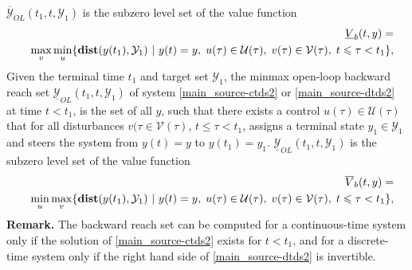 \documentclass[letterpaper,10pt,english]{sphinxmanual}
\begin{document}
$\overline{{\mathcal Y}}_{OL}(t_1, t, {\mathcal Y}_1)$ is the
subzero level set of the value function
\label{main_source:equation-maxminvfb}\begin{gather}
\begin{split}\begin{aligned}
&&\underline{V}_b(t, y) = \nonumber \\
&&\max_v\min_u\{{\bf dist}(y(t_1), {\mathcal Y}_1) ~|~ y(t)=y, \; u(\tau)\in{\mathcal U}(\tau), \;
v(\tau)\in{\mathcal V}(\tau), \; t\leqslant\tau<t_1\},
\end{aligned}\end{split}\label{main_source-maxminvfb}
\end{gather}
Given the terminal time $t_1$ and target set
${\mathcal Y}_1$, the minmax open-loop backward reach set
$\underline{{\mathcal Y}}_{OL}(t_1, t, {\mathcal Y}_1)$ of system
\eqref{main_source-ctds2} or \eqref{main_source-dtds2} at time $t<t_1$, is the set of all $y$,
such that there exists a control $u(\tau)\in{\mathcal U}(\tau)$
that for all disturbances $v(\tau\in{\mathcal V}(\tau)$,
$t\leqslant\tau<t_1$, assigns a terminal state
$y_1\in{\mathcal Y}_1$ and steers the system from $y(t)=y$
to $y(t_1)=y_1$.
$\underline{{\mathcal Y}}_{OL}(t_1, t, {\mathcal Y}_1)$ is the
subzero level set of the value function
\label{main_source:equation-minmaxvfb}\begin{gather}
\begin{split}\begin{aligned}
&&\overline{V}_b(t, y) = \nonumber \\
&&\min_u\max_v\{{\bf dist}(y(t_1), {\mathcal Y}_1) ~|~ y(t)=y, \; u(\tau)\in{\mathcal U}(\tau), \;
v(\tau)\in{\mathcal V}(\tau), \; t\leqslant\tau<t_1\},
\end{aligned}\end{split}\label{main_source-minmaxvfb}
\end{gather}
\textbf{Remark.} The backward reach set can be computed for a continuous-time
system only if the solution of \eqref{main_source-ctds2} exists for $t<t_1$, and
for a discrete-time system only if the right hand side of \eqref{main_source-dtds2} is
invertible.
\end{document}
